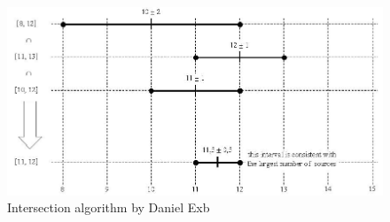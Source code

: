 \begin{figure}
	\centering
	\includegraphics[width=13cm,keepaspectratio]{fig/Marzullo_example-1.jpg}
	\caption{Intersection algorithm by Daniel Exb}
	\label{fig:ntp-intersection}
	\bigskip
\end{figure}

% 
